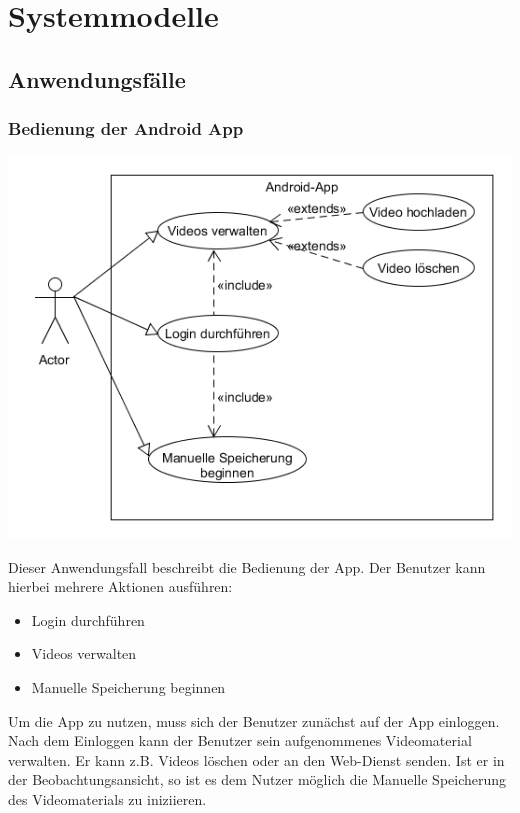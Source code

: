 \chapter{Systemmodelle}
\section{Anwendungsfälle}
\subsection{Bedienung der Android App}
\begin{center}
\includegraphics[width=1\textwidth]{subtopicsFuncspec/Res/systemModels/App-AFD-UML.png}
\end{center}
Dieser Anwendungsfall beschreibt die Bedienung der \gls{App}. 
Der Benutzer kann hierbei mehrere Aktionen ausführen:
\begin{itemize}
\itemsep0pt
\item Login durchführen
\item Videos verwalten
\item Manuelle Speicherung beginnen
\end{itemize}
Um die \gls{App} zu nutzen, muss sich der Benutzer zunächst auf der \gls{App} einloggen. Nach dem Einloggen kann der Benutzer sein aufgenommenes Videomaterial verwalten. Er kann z.B. Videos löschen oder an den \gls{Web-Dienst} senden.
Ist er in der Beobachtungsansicht, so ist es dem Nutzer möglich die Manuelle Speicherung des Videomaterials zu iniziieren.


